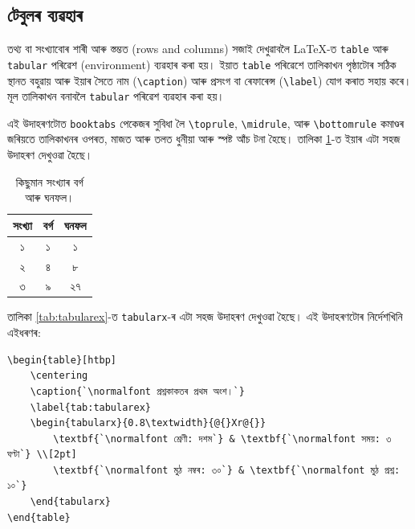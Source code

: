 \documentclass[12pt,a4paper]{article} %
\begin{document}
	\subsection{টেবুলৰ ব্যৱহাৰ}
	
	তথ্য বা সংখ্যাবোৰ শাৰী আৰু স্তম্ভত (rows and columns) সজাই দেখুৱাবলৈ \LaTeX{}-ত \texttt{table} আৰু \texttt{tabular} পৰিৱেশ (environment) ব্যৱহাৰ কৰা হয়। ইয়াত \texttt{table} পৰিৱেশে তালিকাখন পৃষ্ঠাটোৰ সঠিক স্থানত বহুৱায় আৰু ইয়াৰ সৈতে নাম (\texttt{\textbackslash caption}) আৰু প্ৰসংগ বা ৰেফাৰেন্স (\texttt{\textbackslash label}) যোগ কৰাত সহায় কৰে। মূল তালিকাখন বনাবলৈ \texttt{tabular} পৰিৱেশ ব্যৱহাৰ কৰা হয়। 
	
	এই উদাহৰণটোত \texttt{booktabs} পেকেজৰ সুবিধা লৈ \texttt{\textbackslash toprule}, \texttt{\textbackslash midrule}, আৰু \texttt{\textbackslash bottomrule} কমাণ্ডৰ জৰিয়তে তালিকাখনৰ ওপৰত, মাজত আৰু তলত ধুনীয়া আৰু স্পষ্ট আঁচ টনা হৈছে। তালিকা \ref{tab:squares}-ত ইয়াৰ এটা সহজ উদাহৰণ দেখুওৱা হৈছে।
	\begin{table}[h]
		\centering
		\begin{tabular}{ccc}
			\toprule
			সংখ্যা & বৰ্গ & ঘনফল \\
			\midrule
			১ & ১ & ১ \\
			২ & ৪ & ৮ \\
			৩ & ৯ & ২৭ \\
			\bottomrule
		\end{tabular}
		\caption{কিছুমান সংখ্যাৰ বৰ্গ আৰু ঘনফল।}
		\label{tab:squares}
	\end{table}
	
	তালিকা \ref{tab:tabularex}-ত \texttt{tabularx}-ৰ এটা সহজ উদাহৰণ দেখুওৱা হৈছে। এই উদাহৰণটোৰ নিৰ্দেশখিনি এইধৰণৰ:
	
	\begin{lstlisting}
\begin{table}[htbp]
	\centering
	\caption{`\normalfont প্ৰশ্নকাকতৰ প্ৰথম অংশ।`}
	\label{tab:tabularex}
	\begin{tabularx}{0.8\textwidth}{@{}Xr@{}}
		\textbf{`\normalfont শ্ৰেণী: দশম`} & \textbf{`\normalfont সময়: ৩ ঘণ্টা`} \\[2pt]
		\textbf{`\normalfont মুঠ নম্বৰ: ৩০`} & \textbf{`\normalfont মুঠ প্ৰশ্ন: ১০`}
	\end{tabularx}
\end{table}
	\end{lstlisting}
	
\end{document}
